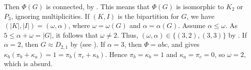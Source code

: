 \documentclass[11pt]{article}
\newtheorem{theorem}{Theorem}[section]
\newcommand{\ap}[1]{\textcolor{red}{\sf{#1}}}
\begin{document}
Then $\Phi(G)$ is connected, by  . This means that $\Phi(G)$ is isomorphic to $K_2$ or $P_3$, ignoring multiplicities. If $(K,I)$ is the bipartition for $G$, we have $(|K|,|I|)=(\omega,\alpha)$, where $\omega=\omega(G)$ and $\alpha=\alpha(G)$. Assume $\alpha\leq\omega$. As $5 \leq \alpha+\omega=|G|$, it follows that $\omega \neq 2$. Thus, $(\omega,\alpha)\in \{(3,2), (3,3)\}$ by .
If $\alpha=2$, then $G\approx D_{2,1}$ by  (see ).
If $\alpha=3$, then $\Phi=abc$, and  gives $\kappa_b(\pi_b+\kappa_a)=1=\pi_b(\pi_c+\kappa_b)$. Hence $\pi_b=\kappa_b=1$ and $\kappa_a=\pi_c=0$, so $\omega=2$, which is absurd.



\end{document}
